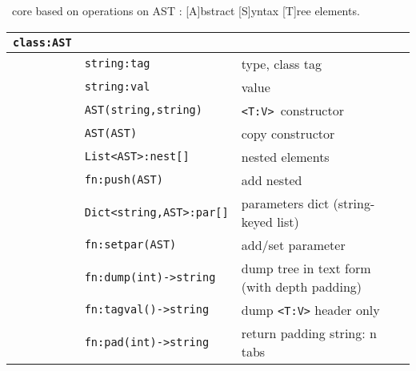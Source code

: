 \label{ast}

\bi\ core based on operations on AST :
[A]bstract [S]yntax [T]ree elements.

\bigskip
\begin{tabular}{l l l}
\verb|class:AST| &&\\
\hline
& \verb|string:tag| & type, class tag \\
& \verb|string:val| & value \\
\hline
& \verb|AST(string,string)| & \verb|<T:V>|\ constructor \\
& \verb|AST(AST)| & copy constructor \\
\hline
& \verb|List<AST>:nest[]| & nested elements \\
& \verb|fn:push(AST)| & add nested \\
\hline
& \verb|Dict<string,AST>:par[]| & parameters dict (string-keyed list) \\
& \verb|fn:setpar(AST)| & add/set parameter \\
\hline
& \verb|fn:dump(int)->string| & dump tree in text form (with depth padding) \\
& \verb|fn:tagval()->string| & dump \verb|<T:V>| header only \\
& \verb|fn:pad(int)->string| & return padding string: n tabs \\  
\end{tabular} 

